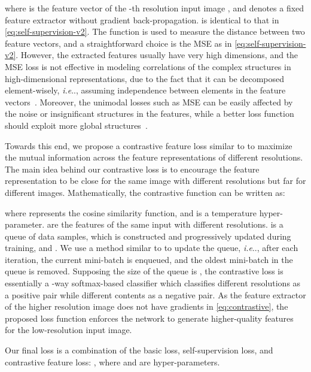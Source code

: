 \documentclass[runningheads]{llncs}
\makeatletter
\DeclareRobustCommand\onedot{\futurelet\@let@token\@onedot}
\def\@onedot{\ifx\@let@token.\else.\null\fi\xspace}
\def\ie{\emph{i.e}\onedot, } \def\Ie{\emph{I.e}\onedot}
\makeatother
\begin{document}
where  is the feature vector of the -th resolution input image , and  denotes a fixed feature extractor without gradient back-propagation. 
 is identical to that in \eqref{eq:self-supervision-v2}.
The function  is used to measure the distance between two feature vectors, and a straightforward choice is the MSE as in \eqref{eq:self-supervision-v2}.
However, the extracted features  usually have very high dimensions, and the MSE loss is not effective in modeling correlations of the complex structures in high-dimensional representations, due to the fact that it can be decomposed element-wisely, \ie assuming independence between elements in the feature vectors~\cite{oord2018representation,tian2019contrastive}.
Moreover, the unimodal losses such as MSE can be easily affected by the noise or insignificant structures in the features, while a better loss function should exploit more global structures~\cite{oord2018representation}.



Towards this end, we propose a contrastive feature loss similar to \cite{oord2018representation,chen2020simple,he2019momentum,tian2019contrastive} to maximize the mutual information across the feature representations of different resolutions.
The main idea behind our contrastive loss is to encourage the feature representation to be close for the same image with different resolutions but far for different images. 
Mathematically, the contrastive function can be written as:

where  represents the cosine similarity function, and  is a temperature hyper-parameter.
 are the features of the same input with different resolutions. 
 is a queue of data samples, which is constructed and progressively updated during training, and .
We use a method similar to \cite{he2019momentum} to update the queue, \ie after each iteration, the current mini-batch is enqueued, and the oldest mini-batch in the queue is removed.
Supposing the size of the queue is ,
the contrastive loss is essentially a -way softmax-based classifier which classifies different resolutions  as a positive pair while different contents  as a negative pair.
As the feature extractor of the higher resolution image does not have gradients in \eqref{eq:contrastive}, the proposed loss function enforces the network to generate higher-quality features for the low-resolution input image. 

Our final loss is a combination of the basic loss, self-supervision loss, and  contrastive feature loss: , where  and  are hyper-parameters.
\end{document}

